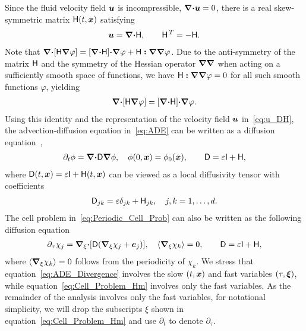 \documentclass[amsa]{ipart}
\begin{document}
Since the fluid velocity field $\boldsymbol{u}$ is incompressible,
$\mbox{\boldmath${\nabla}$}\mbox{\boldmath${\cdot}$}\boldsymbol{u}=0$, there is a 
real skew-symmetric matrix $\mathsf{H}(t,\boldsymbol{x})$
satisfying~\cite{Avellaneda:PRL-753,Avellaneda:CMP-339}   
% 
\begin{align}\label{eq:u_DH}
 \vecu=\bnabla\bcdot\Hm, \qquad   \Hm^{\,T}=-\Hm.
\end{align}
% 
Note that
$\mbox{\boldmath${\nabla}$}\mbox{\boldmath${\cdot}$}[\mathsf{H}\mbox{\boldmath${\nabla}$}\varphi]=[\mbox{\boldmath${\nabla}$}\mbox{\boldmath${\cdot}$}\mathsf{H}]\mbox{\boldmath${\cdot}$}\mbox{\boldmath${\nabla}$}\varphi+\mathsf{H}\boldsymbol{:}\mbox{\boldmath${\nabla}$}\mbox{\boldmath${\nabla}$}\varphi$. Due
to the anti-symmetry of the matrix $\mathsf{H}$ and the symmetry of the Hessian
operator $\mbox{\boldmath${\nabla}$}\mbox{\boldmath${\nabla}$}$ when acting on a sufficiently smooth space
of functions, we have $\mathsf{H}\boldsymbol{:}\mbox{\boldmath${\nabla}$}\mbox{\boldmath${\nabla}$}\varphi=0$ for all such
smooth functions $\varphi$, yielding
%
\begin{align}\label{eq:H:Hessian_identity}
  \bnabla\bcdot[\Hm\bnabla\varphi]=[\bnabla\bcdot\Hm]\bcdot\bnabla\varphi.
\end{align}
%
Using this identity and the
representation of the velocity field $\boldsymbol{u}$ in~\eqref{eq:u_DH}, the
advection-diffusion equation in~\eqref{eq:ADE} can be written as a
diffusion
equation~\cite{Fannjiang:1994:SIAM_JAM:333,Novikov:2005:CPAM:867},     
%
\begin{align}\label{eq:ADE_Divergence}
  \partial_t\phi%
    =\bnabla \bcdot\Dm\bnabla \phi, \quad
    \phi(0,\vecx)=\phi_0(\vecx),
    \qquad
    \Dm=\varepsilon\Ib+\Hm,
\end{align}
%
where $\mathsf{D}(t,\boldsymbol{x})=\varepsilon\mathsf{I}+\mathsf{H}(t,\boldsymbol{x})$ can be viewed as a local
diffusivity tensor with coefficients
%
\begin{align}\label{eq:kappa_coeff}
  \Dm_{jk}=\varepsilon\delta_{jk}+\Hm_{jk},\quad j,k=1,\ldots,d.
\end{align}
%
The cell problem in~\eqref{eq:Periodic_Cell_Prob} can also be
written as the following diffusion
equation~\cite{Fannjiang:1994:SIAM_JAM:333,Novikov:2005:CPAM:867}     
% 
\begin{align}\label{eq:Cell_Problem_Hm}
  \partial_\tau\chi_j=\bnabla_\xi \bcdot[\Dm(\bnabla_\xi \chi_j+\vece_j)],
  \quad
  \langle\bnabla_\xi \chi_k\rangle=0, \qquad
  \Dm=\varepsilon\Ib+\Hm,
\end{align}
%
where $\langle\mbox{\boldmath${\nabla}$}_\xi \chi_k\rangle=0$ follows from the periodicity of $\chi_k$. We
stress that equation~\eqref{eq:ADE_Divergence} involves the slow
$(t,\boldsymbol{x})$ and fast variables $(\tau,\boldsymbol{\xi})$, while
equation~\eqref{eq:Cell_Problem_Hm} involves only the fast variables. 
As the remainder of the analysis involves only the fast variables, for
notational simplicity, we will drop the subscripts $\xi$ shown in
equation~\eqref{eq:Cell_Problem_Hm} and use $\partial_t$ to denote $\partial_\tau$.  
\end{document}
